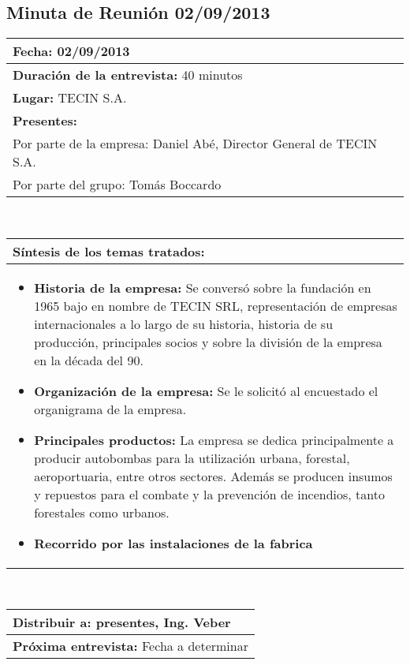 \subsection{Minuta de Reunión 02/09/2013}
\begin{flushleft}
	\begin{tabular}{|p{15cm}|}
		\hline
		\textbf{Fecha:} 02/09/2013 \\ \hline
		\textbf{Duración de la entrevista:} 40 minutos\\ \hline
		\textbf{Lugar:} TECIN S.A.\\ \hline
		\textbf{Presentes:} \\
			Por parte de la empresa: Daniel Abé, Director General de TECIN S.A. \\ 
			Por parte del grupo: Tomás Boccardo \\ \hline
	\end{tabular}  \\
	\vspace{0.7cm}
	\begin{tabular}{|p{15cm}|}
		\hline
		\textbf{Síntesis de los temas tratados:}\\
		\hline
		\begin{itemize}
			\item \textbf{Historia de la empresa:}
			Se conversó sobre la fundación en 1965 bajo en nombre de TECIN SRL, representación de empresas internacionales a lo 				largo de su historia, historia de su producción, principales socios y sobre la división de la empresa en la década 					del 90.

		\item \textbf{Organización de la empresa:} 
		Se le solicitó al encuestado el organigrama de la empresa.

		\item \textbf{Principales productos:} La empresa se dedica principalmente a producir autobombas para 
		la utilización urbana, forestal, aeroportuaria, entre otros sectores. Además se producen insumos y repuestos para el 				combate y la prevención de incendios, tanto forestales como urbanos.
		
		\item \textbf{Recorrido por las instalaciones de la fabrica}

		\end{itemize} \\ \hline
	\end{tabular} \\
	\vspace{0.7cm}
	\begin{tabular}{|p{15cm}|}                
		\hline 
		\textbf{Distribuir a:} presentes, Ing. Veber\\
		\hline
		\textbf{Próxima entrevista:} Fecha a determinar\\
		\hline
	\end{tabular}	
	
\end{flushleft}
